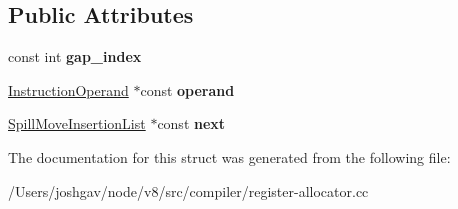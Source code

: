 \subsection*{Public Attributes}
\begin{DoxyCompactItemize}
\item 
const int {\bfseries gap\+\_\+index}\hypertarget{structv8_1_1internal_1_1compiler_1_1_top_level_live_range_1_1_spill_move_insertion_list_a0e4f977b3614d4d7d3b464ddc769a811}{}\label{structv8_1_1internal_1_1compiler_1_1_top_level_live_range_1_1_spill_move_insertion_list_a0e4f977b3614d4d7d3b464ddc769a811}

\item 
\hyperlink{classv8_1_1internal_1_1compiler_1_1_instruction_operand}{Instruction\+Operand} $\ast$const {\bfseries operand}\hypertarget{structv8_1_1internal_1_1compiler_1_1_top_level_live_range_1_1_spill_move_insertion_list_a512610e684d7763eaa474caff5b7c371}{}\label{structv8_1_1internal_1_1compiler_1_1_top_level_live_range_1_1_spill_move_insertion_list_a512610e684d7763eaa474caff5b7c371}

\item 
\hyperlink{structv8_1_1internal_1_1compiler_1_1_top_level_live_range_1_1_spill_move_insertion_list}{Spill\+Move\+Insertion\+List} $\ast$const {\bfseries next}\hypertarget{structv8_1_1internal_1_1compiler_1_1_top_level_live_range_1_1_spill_move_insertion_list_a5d16ff66efe61295d30bea6945c48cbe}{}\label{structv8_1_1internal_1_1compiler_1_1_top_level_live_range_1_1_spill_move_insertion_list_a5d16ff66efe61295d30bea6945c48cbe}

\end{DoxyCompactItemize}


The documentation for this struct was generated from the following file\+:\begin{DoxyCompactItemize}
\item 
/\+Users/joshgav/node/v8/src/compiler/register-\/allocator.\+cc\end{DoxyCompactItemize}
